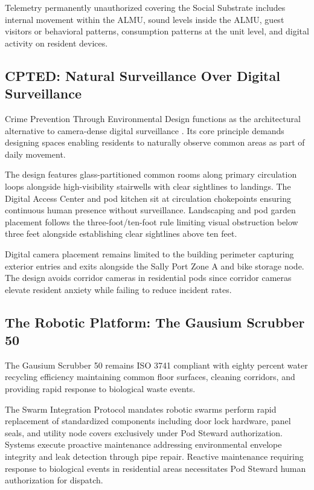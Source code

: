 \documentclass[12pt, letterpaper]{article}
\begin{document}
Telemetry permanently unauthorized covering the Social Substrate includes internal movement within the ALMU, sound levels inside the ALMU, guest visitors or behavioral patterns, consumption patterns at the unit level, and digital activity on resident devices.

\subsection{CPTED: Natural Surveillance Over Digital Surveillance}

Crime Prevention Through Environmental Design functions as the architectural alternative to camera-dense digital surveillance \citep{ctbuh_highrise_2024}. Its core principle demands designing spaces enabling residents to naturally observe common areas as part of daily movement.

The design features glass-partitioned common rooms along primary circulation loops alongside high-visibility stairwells with clear sightlines to landings. The Digital Access Center and pod kitchen sit at circulation chokepoints ensuring continuous human presence without surveillance. Landscaping and pod garden placement follows the three-foot/ten-foot rule limiting visual obstruction below three feet alongside establishing clear sightlines above ten feet.

Digital camera placement remains limited to the building perimeter capturing exterior entries and exits alongside the Sally Port Zone A and bike storage node. The design avoids corridor cameras in residential pods since corridor cameras elevate resident anxiety while failing to reduce incident rates.

\subsection{The Robotic Platform: The Gausium Scrubber 50}

The Gausium Scrubber 50 remains ISO 3741 compliant with eighty percent water recycling efficiency maintaining common floor surfaces, cleaning corridors, and providing rapid response to biological waste events.

The Swarm Integration Protocol mandates robotic swarms perform rapid replacement of standardized components including door lock hardware, panel seals, and utility node covers exclusively under Pod Steward authorization. Systems execute proactive maintenance addressing environmental envelope integrity and leak detection through pipe repair. Reactive maintenance requiring response to biological events in residential areas necessitates Pod Steward human authorization for dispatch.
\end{document}
